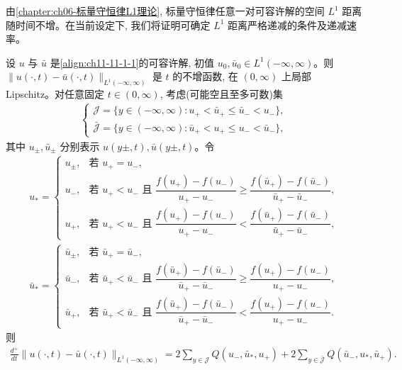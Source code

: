 \documentclass[../../main.tex]{subfiles}
\begin{document}
由\cref{chapter:ch06-标量守恒律L1理论}, 标量守恒律任意一对可容许解的空间 $L^1$ 距离随时间不增。在当前设定下, 我们将证明可确定 $L^1$ 距离严格递减的条件及递减速率。


\begin{theorem}\label{theorem:ch11-11-8-2}
设 $u$ 与 $\bar u$ 是\eqref{align:ch11-11-1-1}的可容许解, 初值 $u_0,\bar u_0\in L^1(-\infty,\infty)$。则 $\|u(\cdot,t)-\bar u(\cdot,t)\|_{L^1(-\infty,\infty)}$ 是 $t$ 的不增函数, 在 $(0,\infty)$ 上局部 Lipschitz。对任意固定 $t\in(0,\infty)$, 考虑(可能空且至多可数)集
\begin{align}
\begin{cases}
\mathscr{J}=\{y\in(-\infty,\infty):u_+<\bar u_+\leqslant\bar u_-<u_-\},\\
\bar{\mathscr{J}}=\{y\in(-\infty,\infty):\bar u_+<u_+\leqslant u_-<\bar u_-\},
\end{cases}\label{align:ch11-11-8-6}
\end{align}
其中 $u_\pm,\bar u_\pm$ 分别表示 $u(y\pm,t),\bar u(y\pm,t)$。令
\begin{align}
u_*=
\begin{cases}
u_\pm, & \text{若 }u_+=u_-,\\
u_-, & \text{若 }u_+<u_-\text{ 且 }\dfrac{f(u_+)-f(u_-)}{u_+-u_-}\geqslant\dfrac{f(\bar u_+)-f(\bar u_-)}{\bar u_+-\bar u_-},\\
u_+, & \text{若 }u_+<u_-\text{ 且 }\dfrac{f(u_+)-f(u_-)}{u_+-u_-}<\dfrac{f(\bar u_+)-f(\bar u_-)}{\bar u_+-\bar u_-},
\end{cases}\label{align:ch11-11-8-7a}
\end{align}
\begin{align}
\bar u_*=
\begin{cases}
\bar u_\pm, & \text{若 }\bar u_+=\bar u_-,\\
\bar u_-, & \text{若 }\bar u_+<\bar u_-\text{ 且 }\dfrac{f(\bar u_+)-f(\bar u_-)}{\bar u_+-\bar u_-}\geqslant\dfrac{f(u_+)-f(u_-)}{u_+-u_-},\\
\bar u_+, & \text{若 }\bar u_+<\bar u_-\text{ 且 }\dfrac{f(\bar u_+)-f(\bar u_-)}{\bar u_+-\bar u_-}<\dfrac{f(u_+)-f(u_-)}{u_+-u_-}.
\end{cases}\label{align:ch11-11-8-7b}
\end{align}
则
\begin{align}
\frac{d^+}{dt}\|u(\cdot,t)-\bar u(\cdot,t)\|_{L^1(-\infty,\infty)}
=2\sum_{y\in\mathscr{J}}Q(u_-,\bar u_*,u_+)+2\sum_{y\in\bar{\mathscr{J}}}Q(\bar u_-,u_*,\bar u_+).\label{align:ch11-11-8-8}
\end{align}
\end{theorem}
\end{document}
